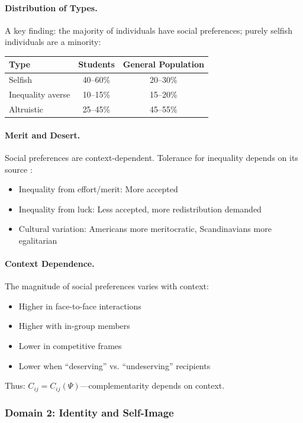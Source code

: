 \paragraph{Distribution of Types.}
A key finding: the majority of individuals have social preferences;
purely selfish individuals are a minority:
\begin{center}
\begin{tabular}{lcc}
\toprule
\textbf{Type} & \textbf{Students} & \textbf{General Population} \\
\midrule
Selfish & 40--60\% & 20--30\% \\
Inequality averse & 10--15\% & 15--20\% \\
Altruistic & 25--45\% & 45--55\% \\
\bottomrule
\end{tabular}
\end{center}

\paragraph{Merit and Desert.}
Social preferences are context-dependent. Tolerance for inequality depends on
its source \citep{cappelen2007,almas2020}:
\begin{itemize}
  \item Inequality from effort/merit: More accepted
  \item Inequality from luck: Less accepted, more redistribution demanded
  \item Cultural variation: Americans more meritocratic, Scandinavians more egalitarian
\end{itemize}

\paragraph{Context Dependence.}
The magnitude of social preferences varies with context:
\begin{itemize}
  \item Higher in face-to-face interactions
  \item Higher with in-group members
  \item Lower in competitive frames
  \item Lower when ``deserving'' vs. ``undeserving'' recipients
\end{itemize}

Thus: $C_{ij} = C_{ij}(\Psi)$---complementarity depends on context.

\subsubsection{Domain 2: Identity and Self-Image}


